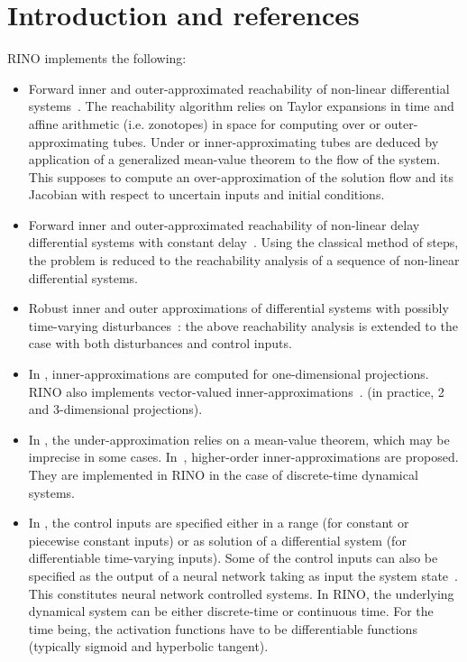 \documentclass{article}
\begin{document}
\section{Introduction and references}
 RINO implements the following:
\begin{itemize}[noitemsep]
\item Forward inner and outer-approximated reachability of non-linear differential systems~\cite{hscc2017}.  The reachability algorithm relies on Taylor expansions in time and affine arithmetic (i.e. zonotopes) in space for computing over or outer-approximating tubes.  Under or inner-approximating tubes are deduced by application of a generalized mean-value theorem to the flow of the system.  This supposes to compute an over-approximation of the solution flow and its Jacobian with respect to uncertain inputs and initial conditions.
\item Forward inner and outer-approximated reachability of non-linear delay differential systems with constant delay~\cite{cav18}.  Using the classical method of steps,  the problem is reduced to the reachability analysis of a sequence of non-linear differential systems. 
\item Robust inner and outer approximations of differential systems with possibly time-varying disturbances~\cite{hscc19}: the above reachability analysis is extended to the case with both disturbances and control inputs.
\item In \cite{hscc2017,cav18,hscc19},  inner-approximations are computed for one-dimensional projections.  RINO also implements vector-valued inner-approximations~\cite{lcss2020}. (in practice, 2 and 3-dimensional projections).
\item In \cite{hscc2017,cav18,hscc19,lcss2020}, the under-approximation relies on a mean-value theorem, which may be imprecise in some cases.  In~\cite{adhs21}, higher-order inner-approximations are proposed.  They are implemented in RINO in the case of discrete-time dynamical systems.   
\item In \cite{hscc2017,cav18,hscc19,lcss2020,adhs21}, the control inputs are specified either in a range (for constant or piecewise constant inputs) or as solution of a differential system (for differentiable time-varying inputs).  Some of the control inputs can also be specified as the output of a neural network taking as input the system state~\cite{cav22}. This constitutes neural network controlled systems.  In RINO, the underlying dynamical system can be either discrete-time or continuous time.  For the time being, the activation functions have to be differentiable functions (typically sigmoid and hyperbolic tangent). 



\end{itemize}
\end{document}
